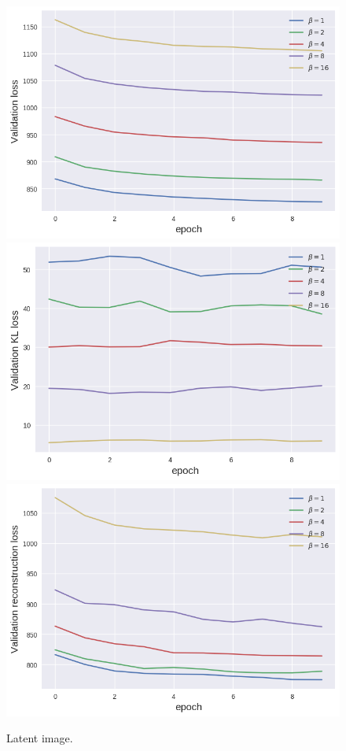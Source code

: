 \begin{figure}[h!]
\centering
\captionsetup{justification=centering}
    \includegraphics[scale=0.5]{figures/results/latent_image/val_loss.png}
    \includegraphics[scale=0.5]{figures/results/latent_image/val_kl_loss.png}
    \includegraphics[scale=0.5]{figures/results/latent_image/val_reconstruction_loss.png}
\caption{Latent image.}
\label{fig:latent_image_graphs}
\end{figure}



